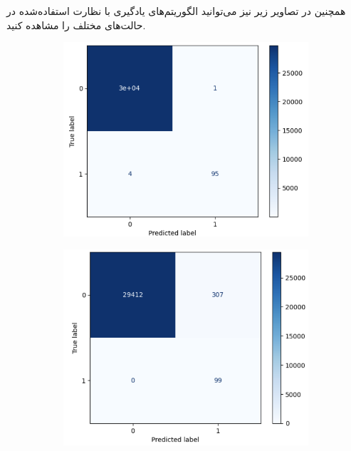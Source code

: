 \documentclass{article}
\begin{document}
همچنین در تصاویر زیر نیز می‌توانید  الگوریتم‌های یادگیری با نظارت استفاده‌شده در حالت‌های مختلف را مشاهده کنید.
\begin{figure}[ht]
    \centering
    \begin{subfigure}[b]{0.36\textwidth}
        \includegraphics[width=\textwidth]{standard-rf-cm.png}
        \caption{}
        \label{fig:fig11}
    \end{subfigure}
    \begin{subfigure}[b]{0.36\textwidth}
        \includegraphics[width=\textwidth]{balanced-rf-cm.png}
        \caption{}
        \label{fig:fig12}
    \end{subfigure}
    

\end{figure}
\end{document}
